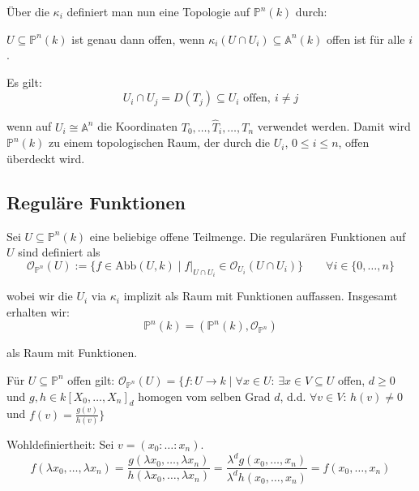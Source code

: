 Über die $\kappa_{i}$ definiert man nun eine Topologie auf $\mathbb{P}^{n}(k)$ durch:

$U\subseteq\mathbb{P}^{n}(k)$ ist genau dann offen, wenn $\kappa_{i}(U\cap U_{i})\subseteq\mathbb{A}^{n}(k)$
offen ist für alle $i$. 

Es gilt: 
\[
  U_{i}\cap U_{j}= D(T_{j})\subseteq U_{i}\text{ offen},\ i\neq j
\]

wenn auf $U_{i}\cong\mathbb{A}^{n}$ die Koordinaten $T_{0},\ldots,\hat{T}_{i},\ldots,T_{n}$
verwendet werden. Damit wird $\mathbb{P}^{n}(k)$ zu einem topologischen
Raum, der durch die $U_{i}$, $0\leq i\leq n$, offen überdeckt wird.

\subsection{Reguläre Funktionen}
\label{subsec:regulaere-fkt-auf-projektivem-raum}

Sei $U\subseteq\mathbb{P}^{n}(k)$ eine beliebige offene Teilmenge.
Die regularären Funktionen auf $U$ sind definiert als
\[
  \mathcal{O}_{\mathbb{P}^{n}}(U) :=\{f\in\text{Abb}(U,k)\mid f|_{U\cap U_{i}}\in\mathcal{O}_{U_{i}}(U\cap U_{i})\}\qquad\forall i\in\{0,\ldots,n\}
\]

wobei wir die $U_{i}$ via $\kappa_{i}$ implizit als Raum mit Funktionen auffassen. Insgesamt erhalten wir:
\[
  \mathbb{P}^{n}(k)=(\mathbb{P}^{n}(k),\mathcal{O}_{\mathbb{P}^{n}})
\]

als Raum mit Funktionen.
\begin{prop}[orig 51]
  \label{prop:charakterisierung-reg-fkt-projektiver-raum}
  Für $U\subseteq\mathbb{P}^{n}$ offen gilt: $\mathcal{O}_{\mathbb{P}^{n}}(U)=\{f:U\rightarrow k\mid\forall x\in U$:
  $\exists x\in V\subseteq U$ offen, $d\geq 0$ und $g,h\in k[X_{0},\ldots,X_{n}]_{d}$
  homogen vom selben Grad $d$, d.d. $\forall v\in V$: $h(v)\neq0$ und
  $f(v)=\frac{g(v)}{h(v)}\}$ 
\end{prop}
Wohldefiniertheit: Sei $v=(x_{0}:\ldots:x_{n})$.
\[
  f(\lambda x_{0},\ldots,\lambda x_{n})=\frac{g(\lambda x_{0},\ldots,\lambda x_{n})}{h(\lambda x_{0},\ldots,\lambda x_{n})}=\frac{\lambda^{d}g(x_{0},\ldots,x_{n})}{\lambda^{d}h(x_{0},\ldots,x_{n})}=f(x_{0},\ldots,x_{n})
\]

